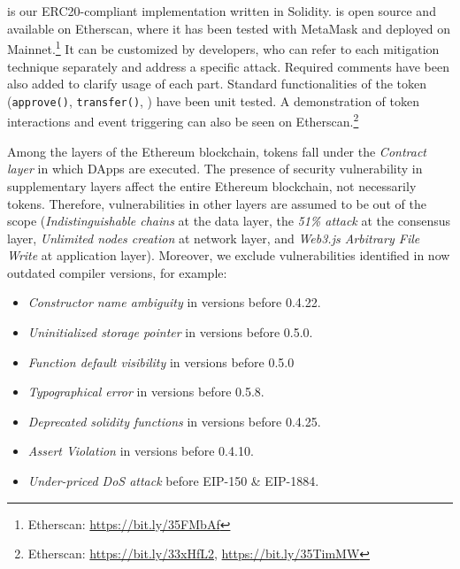 

\section{\sys}\label{sec:proposal}
\sys is our ERC20-compliant implementation written in Solidity. \sys is open source and available on Etherscan, where it has been tested with MetaMask and deployed on Mainnet.\footnote{Etherscan: \url{https://bit.ly/35FMbAf}} It can be customized by developers, who can refer to each mitigation technique separately and address a specific attack. Required comments have been also added to clarify usage of each part. Standard functionalities of the token (\ie \texttt{approve()}, \texttt{transfer()}, \etc) have been unit tested. A demonstration of token interactions and event triggering can also be seen on Etherscan.\footnote{Etherscan: \url{https://bit.ly/33xHfL2}, \url{https://bit.ly/35TimMW}}

Among the layers of the Ethereum blockchain, \erc tokens fall under the \textit{Contract layer} in which DApps are executed. The presence of security vulnerability in supplementary layers affect the entire Ethereum blockchain, not necessarily \erc tokens. Therefore, vulnerabilities in other layers are assumed to be out of the scope (\eg \textit{Indistinguishable chains} at the data layer, the \textit{51\% attack} at the consensus layer, \textit{Unlimited nodes creation} at network layer, and \textit{Web3.js Arbitrary File Write} at application layer). Moreover, we exclude vulnerabilities identified in now outdated compiler versions, for example:
\begin{itemize}[noitemsep,topsep=0pt]
	\item \textit{Constructor name ambiguity} in versions before 0.4.22.
	\item \textit{Uninitialized storage pointer} in versions before 0.5.0.
	\item \textit{Function default visibility} in versions before 0.5.0
	\item \textit{Typographical error} in versions before 0.5.8.
	\item \textit{Deprecated solidity functions} in versions before 0.4.25.
	\item \textit{Assert Violation} in versions before 0.4.10.
	\item \textit{Under-priced DoS attack} before EIP-150 \& EIP-1884.
\end{itemize}


